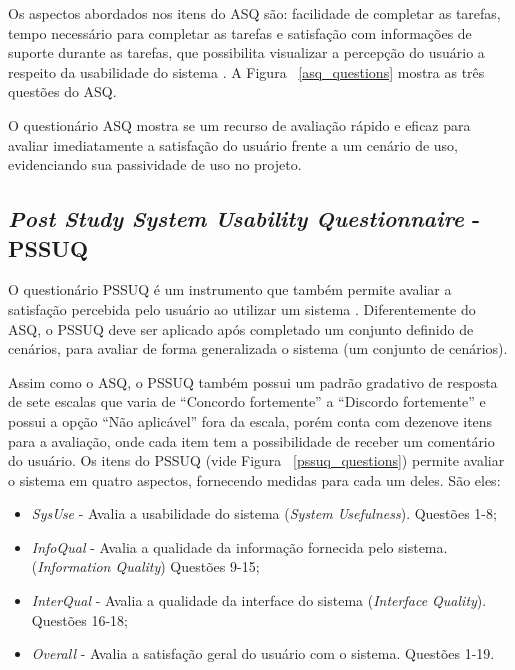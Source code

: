       Os aspectos abordados nos itens do ASQ são: facilidade de completar as tarefas, tempo necessário para completar as tarefas 
      e satisfação com informações de suporte durante as tarefas, que possibilita visualizar a percepção do usuário a respeito da
      usabilidade do sistema \cite{lewis91}. A Figura ~\ref{asq_questions} mostra as três questões do ASQ.
      
      O questionário ASQ mostra se um recurso de avaliação rápido e eficaz para avaliar imediatamente a satisfação do usuário
      frente a um cenário de uso, evidenciando sua passividade de uso no projeto.
    
    \subsection{\textit{Post Study System Usability Questionnaire} - PSSUQ}
      
      O questionário PSSUQ é um instrumento que também permite avaliar a satisfação percebida pelo usuário ao utilizar um
      sistema \cite{lewis02}. Diferentemente do ASQ, o PSSUQ deve ser aplicado após completado um conjunto definido de cenários,
      para avaliar de forma generalizada o sistema (um conjunto de cenários).
      
      Assim como o ASQ, o PSSUQ também possui um padrão gradativo de resposta de sete escalas que varia de “Concordo fortemente”
      a “Discordo fortemente” e possui a opção “Não aplicável” fora da escala, porém conta com dezenove itens para a avaliação,
      onde cada item tem a possibilidade de receber um comentário do usuário. Os itens do PSSUQ (vide Figura ~\ref{pssuq_questions})
      permite avaliar o sistema em quatro aspectos, fornecendo medidas para cada um deles. São eles:
      
      \begin{itemize}
       \item \textit{SysUse} - Avalia a usabilidade do sistema (\textit{System Usefulness}).
	  \subitem Questões 1-8;
      
       \item \textit{InfoQual} - Avalia a qualidade da informação fornecida pelo sistema. (\textit{Information Quality})
	  \subitem Questões 9-15;
	  
       \item \textit{InterQual} - Avalia a qualidade da interface do sistema (\textit{Interface Quality}).
	  \subitem Questões 16-18;
       
       \item \textit{Overall} - Avalia a satisfação geral do usuário com o sistema.
	  \subitem Questões 1-19.

      \end{itemize}
      
